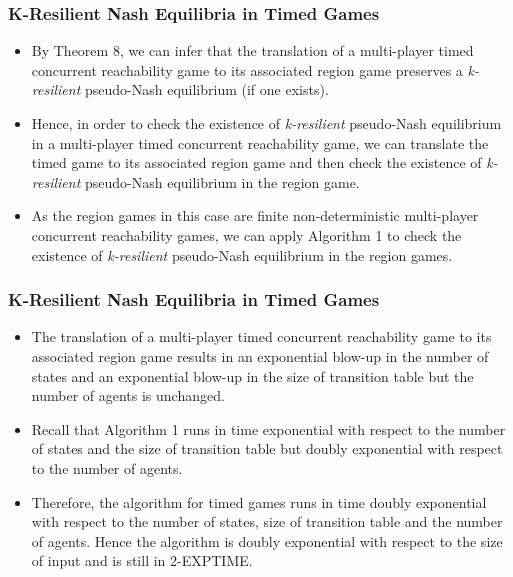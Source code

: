 \documentclass{beamer}
\begin{document}
\begin{frame}
\frametitle{K-Resilient Nash Equilibria in Timed Games}
\begin{itemize}
\item By Theorem 8, we can infer that the translation of a multi-player timed concurrent reachability game to its associated region game preserves a \textit{k-resilient} pseudo-Nash equilibrium (if one exists).
\item Hence, in order to check the existence of \textit{k-resilient} pseudo-Nash equilibrium in a multi-player timed concurrent reachability game, we can translate the timed game to its associated region game and then check the existence of \textit{k-resilient} pseudo-Nash equilibrium in the region game.
\item As the region games in this case are finite non-deterministic multi-player concurrent reachability games, we can apply Algorithm 1 to check the existence of \textit{k-resilient} pseudo-Nash equilibrium in the region games.
\end{itemize}
\end{frame}

\begin{frame}
\frametitle{K-Resilient Nash Equilibria in Timed Games}
\begin{itemize}
\item The translation of a multi-player timed concurrent reachability game to its associated region game results in an exponential blow-up in the number of states and an exponential blow-up in the size of transition table but the number of agents is unchanged.
\item Recall that Algorithm 1 runs in time exponential with respect to the number of states and the size of transition table but doubly exponential with respect to the number of agents.
\item Therefore, the algorithm for timed games runs in time doubly exponential with respect to the number of states, size of transition table and the number of agents. Hence the algorithm is doubly exponential with respect to the size of input and is still in 2-EXPTIME.
\end{itemize}
\end{frame}
\end{document}
